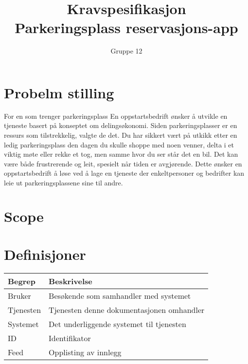 \documentclass[12pt]{article}
\begin{document}
\title{%
    Kravspesifikasjon\\
    \large Parkeringsplass reservasjons-app }
\author{Gruppe 12}
\date{}
\maketitle

\newpage

\tableofcontents

\newpage

\section{Probelm stilling}{For en som trenger parkeringsplass}
En oppstartsbedrift ønsker å utvikle en tjeneste basert på konseptet om delingsøkonomi. Siden parkeringsplasser er en ressurs som tilstrekkelig, valgte de det. Du har sikkert vært på utkikk etter en ledig parkeringsplass den dagen du skulle shoppe med noen venner, delta i et viktig møte eller rekke et tog, men samme hvor du ser står det en bil. Det kan være både frustrerende og leit, spesielt når tiden er avgjørende. Dette ønsker en oppstartsbedrift å løse ved å lage en tjeneste der enkeltpersoner og bedrifter kan leie ut parkeringsplassene sine til andre.


\section{Scope}

\section{Definisjoner}

\begin{center}
    \begin{tabular}{|p{4cm}|p{12cm}| } 
        \hline
        \bf Begrep & \bf Beskrivelse \\
        \hline
        Bruker & Besøkende som samhandler med systemet \\
        \hline
        Tjenesten & Tjenesten denne dokumentasjonen omhandler \\
        \hline
        Systemet & Det underliggende systemet til tjenesten \\
        \hline
        ID & Identifikator \\
        \hline
        Feed & Opplisting av innlegg \\
        \hline
    \end{tabular}
\end{center}
\end{document}
